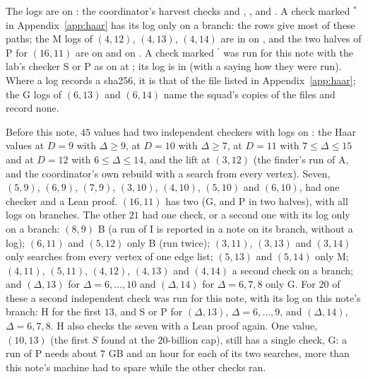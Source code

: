 \documentclass[11pt]{amsart}
\theoremstyle{definition}
\theoremstyle{remark}
\begin{document}
The logs are on : the coordinator's harvest checks  and , ,  and . A check marked $^\ast$ in Appendix~\ref{app:haar} has its log only on a branch: the  rows give most of these paths; the M logs of $(4,12)$, $(4,13)$, $(4,14)$ are in  on , and the two halves of P for $(16,11)$ are  on  and  on . A check marked $^\prime$ was run for this note with the lab's checker S or P as on  at ; its log is in  (with a  saying how they were run). Where a log records a sha256, it is that of the file listed in Appendix~\ref{app:haar}; the G logs of $(6,13)$ and $(6,14)$ name the squad's copies of the files and record none.

Before this note, $45$ values had two independent checkers with logs on : the Haar values at $D=9$ with $\Delta\ge9$, at $D=10$ with $\Delta\ge7$, at $D=11$ with $7\le\Delta\le15$ and at $D=12$ with $6\le\Delta\le14$, and the lift at $(3,12)$ (the finder's run of A, and the coordinator's own rebuild with a search from every vertex). Seven, $(5,9)$, $(6,9)$, $(7,9)$, $(3,10)$, $(4,10)$, $(5,10)$ and $(6,10)$, had one checker and a Lean proof. $(16,11)$ has two (G, and P in two halves), with all logs on branches. The other $21$ had one check, or a second one with its log only on a branch: $(8,9)$ B (a run of I is reported in a note on its branch, without a log); $(6,11)$ and $(5,12)$ only B (run twice); $(3,11)$, $(3,13)$ and $(3,14)$ only searches from every vertex of one edge list; $(5,13)$ and $(5,14)$ only M; $(4,11)$, $(5,11)$, $(4,12)$, $(4,13)$ and $(4,14)$ a second check on a branch; and $(\Delta,13)$ for $\Delta=6,\dots,10$ and $(\Delta,14)$ for $\Delta=6,7,8$ only G. For $20$ of these a second independent check was run for this note, with its log on this note's branch: H for the first $13$, and S or P for $(\Delta,13)$, $\Delta=6,\dots,9$, and $(\Delta,14)$, $\Delta=6,7,8$. H also checks the seven with a Lean proof again. One value, $(10,13)$ (the first $S$ found at the $20$-billion cap), still has a single check, G: a run of P needs about $7$ GB and an hour for each of its two searches, more than this note's machine had to spare while the other checks ran.
\end{document}
